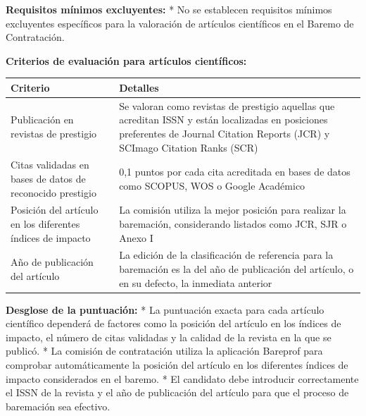 \documentclass{article}
\begin{document}
\begin{itemize}
\begin{itemize}
                \textbf{Requisitos mínimos excluyentes:}
                * No se establecen requisitos mínimos excluyentes específicos para la valoración de artículos científicos en el Baremo de Contratación.

                \textbf{Criterios de evaluación para artículos científicos:}

                \vspace{0.4cm}
                \begin{table}[h!]\centering\renewcommand{\arraystretch}{1.3}
                  \begin{tabular}{|p{}|p{}|}\hline
                    Criterio                                                   & Detalles                                                                                                                                                                         \\\hline
                    Publicación en revistas de prestigio                       & Se valoran como revistas de prestigio aquellas que acreditan ISSN y están localizadas en posiciones preferentes de Journal Citation Reports (JCR) y SCImago Citation Ranks (SCR) \\\hline
                    Citas validadas en bases de datos de reconocido prestigio  & 0,1 puntos por cada cita acreditada en bases de datos como SCOPUS, WOS o Google Académico                                                                                        \\\hline
                    Posición del artículo en los diferentes índices de impacto & La comisión utiliza la mejor posición para realizar la baremación, considerando listados como JCR, SJR o Anexo I                                                                 \\\hline
                    Año de publicación del artículo                            & La edición de la clasificación de referencia para la baremación es la del año de publicación del artículo, o en su defecto, la inmediata anterior                                \\\hline
                  \end{tabular}\end{table}
                \vspace{0.4cm}

                \textbf{Desglose de la puntuación:}
                * La puntuación exacta para cada artículo científico dependerá de factores como la posición del artículo en los índices de impacto, el número de citas validadas y la calidad de la revista en la que se publicó.
                * La comisión de contratación utiliza la aplicación Bareprof para comprobar automáticamente la posición del artículo en los diferentes índices de impacto considerados en el baremo.
                * El candidato debe introducir correctamente el ISSN de la revista y el año de publicación del artículo para que el proceso de baremación sea efectivo.


\end{itemize}
\end{itemize}
\end{document}
